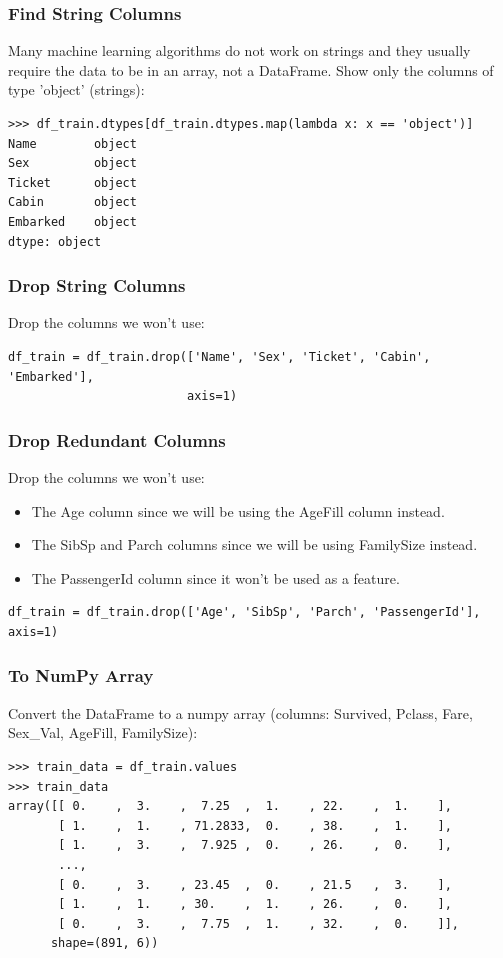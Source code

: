 \begin{frame}[fragile]\frametitle{Find String Columns}
Many machine learning algorithms do not work on strings and they usually require the data to be in an array, not a DataFrame. Show only the columns of type 'object' (strings):

\begin{lstlisting}
>>> df_train.dtypes[df_train.dtypes.map(lambda x: x == 'object')]
Name        object
Sex         object
Ticket      object
Cabin       object
Embarked    object
dtype: object
\end{lstlisting}
\end{frame}

\begin{frame}[fragile]\frametitle{Drop String Columns}
Drop the columns we won't use:
\begin{lstlisting}
df_train = df_train.drop(['Name', 'Sex', 'Ticket', 'Cabin', 'Embarked'],
                         axis=1)
\end{lstlisting}

\end{frame}

\begin{frame}[fragile]\frametitle{Drop Redundant Columns}
Drop the columns we won't use:
\begin{itemize}
\item  The Age column since we will be using the AgeFill column instead.
\item     The SibSp and Parch columns since we will be using FamilySize instead.
\item     The PassengerId column since it won't be used as a feature.
\end{itemize}
\begin{lstlisting}
df_train = df_train.drop(['Age', 'SibSp', 'Parch', 'PassengerId'], axis=1)
\end{lstlisting}
\end{frame}

\begin{frame}[fragile]\frametitle{To NumPy Array}
Convert the DataFrame to a numpy array (columns: Survived, Pclass, Fare, Sex\_Val, AgeFill, FamilySize):
\begin{lstlisting}
>>> train_data = df_train.values
>>> train_data
array([[ 0.    ,  3.    ,  7.25  ,  1.    , 22.    ,  1.    ],
       [ 1.    ,  1.    , 71.2833,  0.    , 38.    ,  1.    ],
       [ 1.    ,  3.    ,  7.925 ,  0.    , 26.    ,  0.    ],
       ...,
       [ 0.    ,  3.    , 23.45  ,  0.    , 21.5   ,  3.    ],
       [ 1.    ,  1.    , 30.    ,  1.    , 26.    ,  0.    ],
       [ 0.    ,  3.    ,  7.75  ,  1.    , 32.    ,  0.    ]],
      shape=(891, 6))
\end{lstlisting}
\end{frame}

